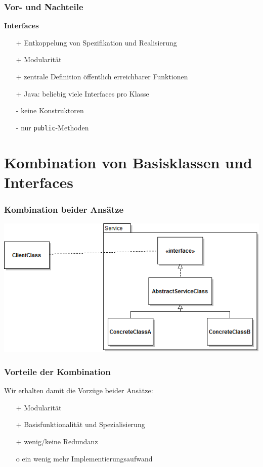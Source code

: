 \documentclass[12pt]{beamer}
\begin{document}
\begin{frame}
	\frametitle{Vor- und Nachteile}
	\textbf{Interfaces}
	\newline
	\begin{itemize}
		\item[+] Entkoppelung von Spezifikation und Realisierung
		\item[+] Modularität
		\item[+] zentrale Definition öffentlich erreichbarer Funktionen
		\item[+] Java: beliebig viele Interfaces pro Klasse
		\item[-] keine Konstruktoren
		\item[-] nur \texttt{public}-Methoden
	\end{itemize}
\end{frame}

\section{Kombination von Basisklassen und Interfaces}

\begin{frame}
	\frametitle{Kombination beider Ansätze}
	\centerline{\includegraphics[scale=0.5]{src/img/Kombi}}
\end{frame}

\begin{frame}
	\frametitle{Vorteile der Kombination}
	Wir erhalten damit die Vorzüge beider Ansätze:
	\begin{itemize}
		\item[+] Modularität
		\item[+] Basisfunktionalität und Spezialisierung
		\item[+] wenig/keine Redundanz
		\item[o] ein wenig mehr Implementierungsaufwand
	\end{itemize}
\end{frame}
\end{document}
